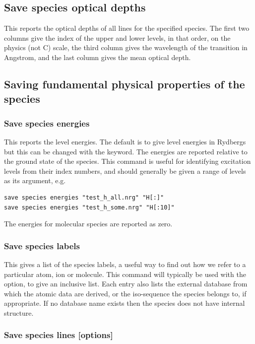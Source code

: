 \subsection{Save species optical depths}
\label{sec:SaveSpeciesOpticalDepths}
This reports the optical depths of all lines for the specified species.
The first two columns give the index of the upper and lower levels, in
that order, on the physics (not C) scale, the third column gives the
wavelength of the transition in Angstrom, and the last column gives
the mean optical depth.


\subsection{Saving fundamental physical properties of the species}

\subsubsection{Save species energies}
This reports the level energies.  The default is to give level
energies in Rydbergs but this can be changed with the
 keyword.  The energies are reported relative to the
ground state of the species.  This command is useful for identifying
excitation levels from their index numbers, and should generally be
given a range of levels as its argument, e.g.
\begin{verbatim}
save species energies "test_h_all.nrg" "H[:]"
save species energies "test_h_some.nrg" "H[:10]"
\end{verbatim}
The energies for molecular species are reported as zero.

\subsubsection{Save species labels}
\label{sec:SaveSpeciesLabels}
This gives a list of the species labels, a useful way to find out how
we refer to a particular atom, ion or molecule.  This command will
typically be used with the  option, to give an
inclusive list.
Each entry also lists the external database from which the atomic
data are derived, or the iso-sequence the species belongs to, if
appropriate.
If no database name exists then the species does not have internal structure.

\subsubsection{Save species lines [options]}
\label{sec:CommandSaveSpeciesLines}


